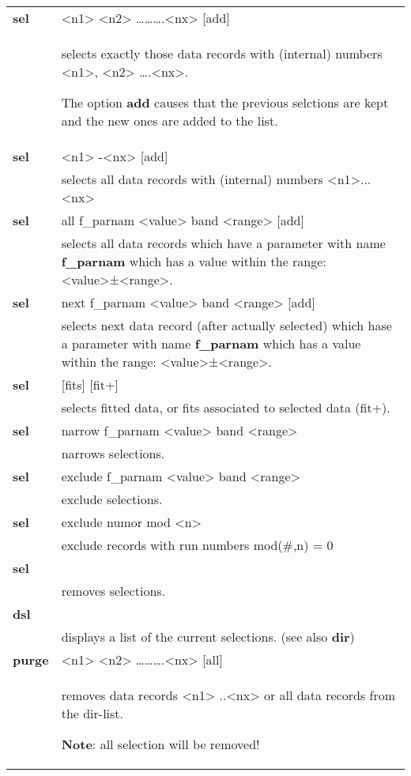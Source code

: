 \documentclass[]{article}
\begin{document}
\begin{longtable}[]{@{}ll@{}}
\toprule
\endhead
\textbf{sel} & \textless{}n1\textgreater{} \textless{}n2\textgreater{}
\ldots{}\ldots{}\ldots{}.\textless{}nx\textgreater{}
{[}add{]}\tabularnewline
\begin{minipage}[t]{0.47\columnwidth}\raggedright
\strut
\end{minipage} & \begin{minipage}[t]{0.47\columnwidth}\raggedright
selects exactly those data records with (internal) numbers
\textless{}n1\textgreater{}, \textless{}n2\textgreater{}
\ldots{}.\textless{}nx\textgreater{}.

The option \textbf{add} causes that the previous selctions are kept and
the new ones are added to the list.\strut
\end{minipage}\tabularnewline
\textbf{sel} & \textless{}n1\textgreater{} -\textless{}nx\textgreater{}
{[}add{]}\tabularnewline
& selects all data records with (internal) numbers
\textless{}n1\textgreater{}...\textless{}nx\textgreater{}\tabularnewline
\textbf{sel} & all f\_parnam \textless{}value\textgreater{} band
\textless{}range\textgreater{} {[}add{]}\tabularnewline
& selects all data records which have a parameter with name
\textbf{f\_parnam} which has a value within the range:
\textless{}value\textgreater{}±\textless{}range\textgreater{}.\tabularnewline
\textbf{sel} & next f\_parnam \textless{}value\textgreater{} band
\textless{}range\textgreater{} {[}add{]}\tabularnewline
& selects next data record (after actually selected) which hase a
parameter with name \textbf{f\_parnam} which has a value within the
range:
\textless{}value\textgreater{}±\textless{}range\textgreater{}.\tabularnewline
\textbf{sel} & {[}fits{]} {[}fit+{]}\tabularnewline
& selects fitted data, or fits associated to selected data
(fit+).\tabularnewline
\textbf{sel} & narrow f\_parnam \textless{}value\textgreater{} band
\textless{}range\textgreater{}\tabularnewline
& narrows selections.\tabularnewline
\textbf{sel} & exclude f\_parnam \textless{}value\textgreater{} band
\textless{}range\textgreater{}\tabularnewline
& exclude selections.\tabularnewline
\textbf{sel} & exclude numor mod
\textless{}n\textgreater{}\tabularnewline
& exclude records with run numbers mod(\#,n) = 0\tabularnewline
\textbf{sel} &\tabularnewline
& removes selections.\tabularnewline
\textbf{dsl} &\tabularnewline
& displays a list of the current selections. (see also
\textbf{dir})\tabularnewline
\textbf{purge} & \textless{}n1\textgreater{} \textless{}n2\textgreater{}
\ldots{}\ldots{}\ldots{}.\textless{}nx\textgreater{}
{[}all{]}\tabularnewline
\begin{minipage}[t]{0.47\columnwidth}\raggedright
\strut
\end{minipage} & \begin{minipage}[t]{0.47\columnwidth}\raggedright
removes data records \textless{}n1\textgreater{}
..\textless{}nx\textgreater{} or all data records from the dir-list.

\textbf{Note}: all selection will be removed!\strut
\end{minipage}\tabularnewline
\bottomrule
\end{longtable}
\end{document}
